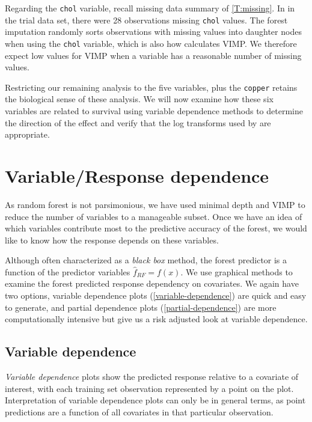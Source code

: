 \documentclass[article, nojss]{jss}
\begin{document}
Regarding the \texttt{chol} variable, recall missing data summary of
\autoref{T:missing}. In in the trial data set, there were 28
observations missing \texttt{chol} values. The forest imputation
randomly sorts observations with missing values into daughter nodes when
using the \texttt{chol} variable, which is also how
 calculates VIMP. We therefore expect low values
for VIMP when a variable has a reasonable number of missing values.

Restricting our remaining analysis to the five\citep{fleming:1991}
variables, plus the \texttt{copper} retains the biological sense of
these analysis. We will now examine how these six variables are related
to survival using variable dependence methods to determine the direction
of the effect and verify that the log transforms used
by\citep{fleming:1991} are appropriate.

\section{Variable/Response
dependence}\label{variableresponse-dependence}

As random forest is not parsimonious, we have used minimal depth and
VIMP to reduce the number of variables to a manageable subset. Once we
have an idea of which variables contribute most to the predictive
accuracy of the forest, we would like to know how the response depends
on these variables.

Although often characterized as a \emph{black box} method, the forest
predictor is a function of the predictor variables
\(\hat{f}_{RF} = f(x).\) We use graphical methods to examine the forest
predicted response dependency on covariates. We again have two options,
variable dependence plots (\autoref{variable-dependence}) are quick and
easy to generate, and partial dependence plots
(\autoref{partial-dependence}) are more computationally intensive but
give us a risk adjusted look at variable dependence.

\subsection{Variable dependence}\label{variable-dependence}

\emph{Variable dependence} plots show the predicted response relative to
a covariate of interest, with each training set observation represented
by a point on the plot. Interpretation of variable dependence plots can
only be in general terms, as point predictions are a function of all
covariates in that particular observation.
\end{document}
